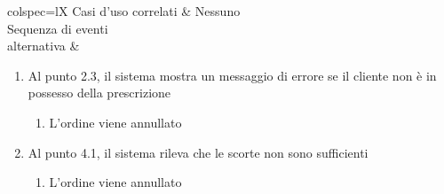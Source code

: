 \begin{table}[!hbp]
\begin{scenery}{colspec=lX}
		Casi d'uso correlati & Nessuno \\
		{Sequenza di eventi \\ alternativa} &
			\begin{enumerate}
				\item Al punto 2.3, il sistema mostra un messaggio di errore se il cliente non è in possesso della prescrizione
				\begin{enumerate}[label*=\arabic*.]
					\item L'ordine viene annullato
				\end{enumerate}
				\item Al punto 4.1, il sistema rileva che le scorte non sono sufficienti
					\begin{enumerate}[label*=\arabic*.]
						\item L'ordine viene annullato
					\end{enumerate}
			\end{enumerate} \\
	\end{scenery}
\end{table}
